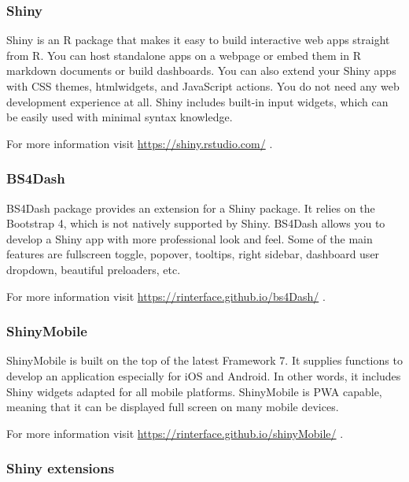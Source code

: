 \documentclass[
]{article}
\begin{document}
\hypertarget{shiny}{%
\subsubsection{Shiny}\label{shiny}}

Shiny is an R package that makes it easy to build interactive web apps
straight from R. You can host standalone apps on a webpage or embed them
in R markdown documents or build dashboards. You can also extend your
Shiny apps with CSS themes, htmlwidgets, and JavaScript actions. You do
not need any web development experience at all. Shiny includes built-in
input widgets, which can be easily used with minimal syntax knowledge.

For more information visit \url{https://shiny.rstudio.com/} .

\hypertarget{bs4dash}{%
\subsubsection{BS4Dash}\label{bs4dash}}

BS4Dash package provides an extension for a Shiny package. It relies on
the Bootstrap 4, which is not natively supported by Shiny. BS4Dash
allows you to develop a Shiny app with more professional look and feel.
Some of the main features are fullscreen toggle, popover, tooltips,
right sidebar, dashboard user dropdown, beautiful preloaders, etc.

For more information visit \url{https://rinterface.github.io/bs4Dash/} .

\hypertarget{shinymobile}{%
\subsubsection{ShinyMobile}\label{shinymobile}}

ShinyMobile is built on the top of the latest Framework 7. It supplies
functions to develop an application especially for iOS and Android. In
other words, it includes Shiny widgets adapted for all mobile platforms.
ShinyMobile is PWA capable, meaning that it can be displayed full screen
on many mobile devices.

For more information visit
\url{https://rinterface.github.io/shinyMobile/} .

\hypertarget{shiny-extensions}{%
\subsubsection{Shiny extensions}\label{shiny-extensions}}
\end{document}
